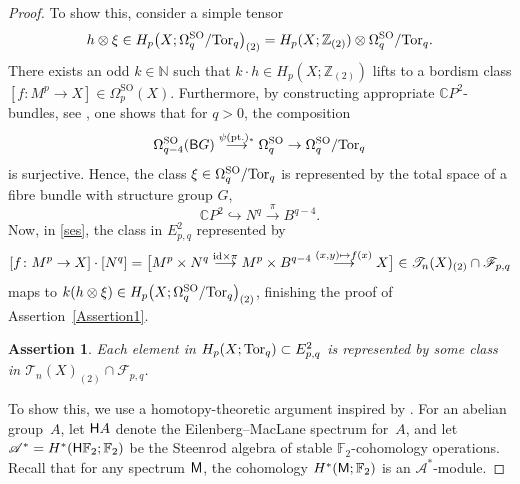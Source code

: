 \documentclass[10pt,a4paper]{amsart}
\numberwithin{equation}{section}
\newtheorem{Assertion}[Theorem]{Assertion}
\newcommand{\F}{\mathbb{F}}
\newcommand{\Z}{\mathbb{Z}}
\newcommand{\C}{\mathbb{C}}
\newcommand{\N}{\mathbb{N}}
\newcommand{\SO}{\mathrm{SO}}
\newcommand{\id}{{\rm id}}
\newcommand{\sB}{{\sf B}}
\newcommand{\Tor}{{\rm Tor}}
\begin{document}
\begin{proof}
To show this, consider a simple tensor
\[
 h \otimes \xi \in H_p\big(X; \Omega_q^{\SO} / \Tor_q \big)_{(2)} = H_p(X; \Z_{(2)}) \otimes \Omega_q^{\SO} / \Tor_q .
\]
There exists an odd $k \in \N$ such that $k\cdot h \in H_p(X; \Z_{(2)})$ lifts to a bordism class $ [ f \colon M^p \to X] \in \Omega_p^{\SO}(X)$.
Furthermore, by constructing appropriate $\C P^2$-bundles, see \cite[Proposition 8.2]{Fuehring_bordism}, one shows that for $q > 0$, the composition
\[
 \Omega^{\SO}_{q-4} (\sB G) \stackrel{\psi({\rm pt.})_*}{\longrightarrow} \Omega^{\SO}_{q} \to \Omega^{\SO}_q/ \Tor_q
\]
is surjective.
Hence, the class $\xi \in \Omega_q^{\SO} / \Tor_q$ is represented by the total space of a fibre bundle with structure group $G$,
\[
 \C P^2 \hookrightarrow N^q \stackrel{\pi}{\longrightarrow} B^{q-4}.
 \]
Now, in \eqref{ses}, the class in $E^2_{p,q}$ represented by
\[
 [ f \colon M^p \to X] \cdot [N^q] = \big[M^p \times N^q \stackrel{\id \times \pi}{\longrightarrow} M^p \times B^{q-4} \stackrel{(x,y) \mapsto f(x)}{\longrightarrow} X\big] \in \mathscr{T}_n(X)_{(2)} \cap \mathscr{F}_{p,q}
\]
maps to $k ( h \otimes \xi) \in H_p\big(X; \Omega^{\SO}_q / \Tor_q \big)_{(2)}$, finishing the proof of Assertion~\ref{Assertion1}.


\begin{Assertion}\label{Assertion2}
 Each element in $H_p(X; \Tor_q) \subset E^2_{p,q}$ is represented by some class in $\mathscr{T}_n(X)_{(2)} \cap \mathscr{F}_{p,q}$.
\end{Assertion}


To show this, we use a homotopy-theoretic argument inspired by \cite{Stolz_splitting}.
For an abelian group~$A$, let ${\sf H}A$ denote the Eilenberg--MacLane spectrum for~$A$, and let $\mathscr{A}^*=H^*({\sf H}\F_2; \F_2)$ be the Steenrod algebra of stable $\F_2$-cohomology operations.
Recall that for any spectrum ${\sf M}$, the cohomology $H^*({\sf M}; \F_2)$ is an $\mathscr{A}^*$-module.


\end{proof}
\end{document}
